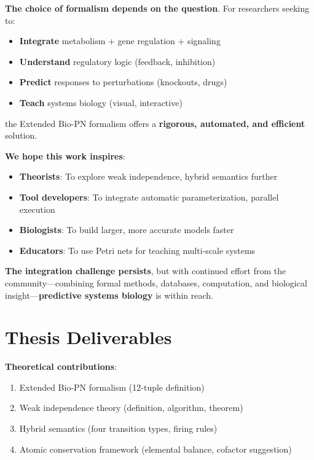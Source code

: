 \textbf{The choice of formalism depends on the question}. For researchers seeking to:
\begin{itemize}
    \item \textbf{Integrate} metabolism + gene regulation + signaling
    \item \textbf{Understand} regulatory logic (feedback, inhibition)
    \item \textbf{Predict} responses to perturbations (knockouts, drugs)
    \item \textbf{Teach} systems biology (visual, interactive)
\end{itemize}

the Extended Bio-PN formalism offers a \textbf{rigorous, automated, and efficient} solution.

\textbf{We hope this work inspires}:
\begin{itemize}
    \item \textbf{Theorists}: To explore weak independence, hybrid semantics further
    \item \textbf{Tool developers}: To integrate automatic parameterization, parallel execution
    \item \textbf{Biologists}: To build larger, more accurate models faster
    \item \textbf{Educators}: To use Petri nets for teaching multi-scale systems
\end{itemize}

\textbf{The integration challenge persists}, but with continued effort from the community—combining formal methods, databases, computation, and biological insight—\textbf{predictive systems biology} is within reach.

\section{Thesis Deliverables}
\label{sec:deliverables}

\textbf{Theoretical contributions}:
\begin{enumerate}
    \item Extended Bio-PN formalism (12-tuple definition)
    \item Weak independence theory (definition, algorithm, theorem)
    \item Hybrid semantics (four transition types, firing rules)
    \item Atomic conservation framework (elemental balance, cofactor suggestion)
\end{enumerate}

